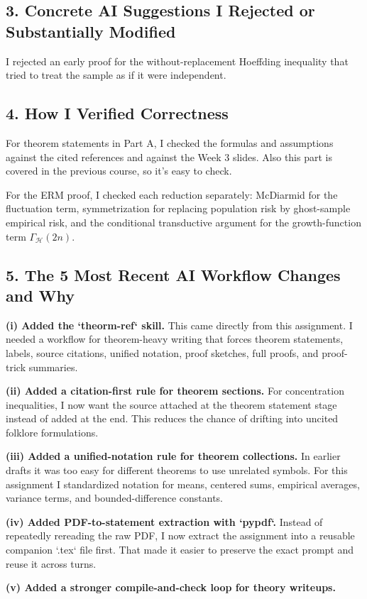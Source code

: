 \documentclass{article}
\theoremstyle{definition}
\theoremstyle{remark}
\newcommand{\cH}{\mathcal{H}}
\begin{document}
\subsection*{3. Concrete AI Suggestions I Rejected or Substantially Modified}

I rejected an early proof for the without-replacement Hoeffding inequality that tried to treat the sample as if it were independent.

\subsection*{4. How I Verified Correctness}

For theorem statements in Part A, I checked the formulas and assumptions against the cited references and against the Week 3 slides. Also this part is covered in the previous course, so it's easy to check.

For the ERM proof, I checked each reduction separately: McDiarmid for the fluctuation term, symmetrization for replacing population risk by ghost-sample empirical risk, and the conditional transductive argument for the growth-function term $\Gamma_{\cH}(2n)$.

\subsection*{5. The 5 Most Recent AI Workflow Changes and Why}

\textbf{(i) Added the `theorm-ref` skill.} This came directly from this assignment. I needed a workflow for theorem-heavy writing that forces theorem statements, labels, source citations, unified notation, proof sketches, full proofs, and proof-trick summaries.

\textbf{(ii) Added a citation-first rule for theorem sections.} For concentration inequalities, I now want the source attached at the theorem statement stage instead of added at the end. This reduces the chance of drifting into uncited folklore formulations.

\textbf{(iii) Added a unified-notation rule for theorem collections.} In earlier drafts it was too easy for different theorems to use unrelated symbols. For this assignment I standardized notation for means, centered sums, empirical averages, variance terms, and bounded-difference constants.

\textbf{(iv) Added PDF-to-statement extraction with `pypdf`.} Instead of repeatedly rereading the raw PDF, I now extract the assignment into a reusable companion `.tex` file first. That made it easier to preserve the exact prompt and reuse it across turns.

\textbf{(v) Added a stronger compile-and-check loop for theory writeups.}
\end{document}
